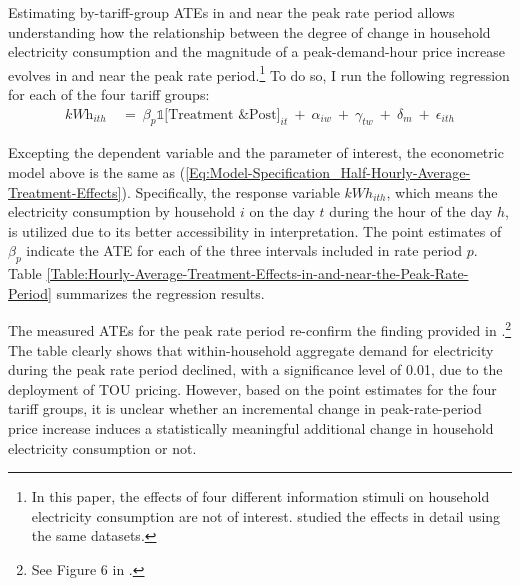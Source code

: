 Estimating by-tariff-group ATEs in and near the peak rate period allows understanding how the relationship between the degree of change in household electricity consumption and the magnitude of a peak-demand-hour price increase evolves in and near the peak rate period.\footnote{In this paper, the effects of four different information stimuli on household electricity consumption are not of interest. \cite{The-Effect-of-Information-on-TOU-Electricity-Use:An-Irish-Residential-Study_Pon_2017} studied the effects in detail using the same datasets.} To do so, I run the following regression for each of the four tariff groups:
\begin{equation}
\begin{split}
    \textit{kWh}_{ith} \ 
    & = \ \beta_{p} \mathbb{1}\big[ \text{Treatment \& Post} \big]_{it} \ + \ \alpha_{iw} \ + \ \gamma_{tw} \ + \ \delta_{m} \ + \ \epsilon_{ith}
\end{split}
\label{Eq:Model-Specification_Hourly-Average-Treatment-Effects}
\end{equation}

Excepting the dependent variable and the parameter of interest, the econometric model above is the same as (\ref{Eq:Model-Specification_Half-Hourly-Average-Treatment-Effects}). Specifically, the response variable $kWh_{ith}$, which means the electricity consumption by household $i$ on the day $t$ during the hour of the day $h$, is utilized due to its better accessibility in interpretation. The point estimates of $\beta_{p}$ indicate the ATE for each of the three intervals included in rate period $p$. Table \ref{Table:Hourly-Average-Treatment-Effects-in-and-near-the-Peak-Rate-Period} summarizes the regression results. 

The measured ATEs for the peak rate period re-confirm the finding provided in \cite{Peaking-Interest:How-Awareness-Drives-the-Effectiveness-of-Time-of-Use-Electricity-Pricing_Prest_2020}.\footnote{See Figure 6 in \cite{Peaking-Interest:How-Awareness-Drives-the-Effectiveness-of-Time-of-Use-Electricity-Pricing_Prest_2020}.} The table clearly shows that within-household aggregate demand for electricity during the peak rate period declined, with a significance level of 0.01, due to the deployment of TOU pricing. However, based on the point estimates for the four tariff groups, it is unclear whether an incremental change in peak-rate-period price increase induces a statistically meaningful additional change in household electricity consumption or not. 

